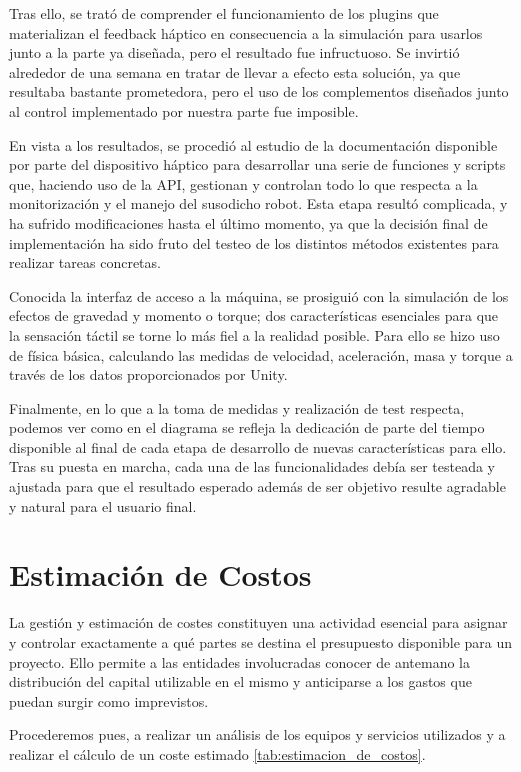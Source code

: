 Tras ello, se trató de comprender el funcionamiento de los plugins que materializan el feedback háptico en consecuencia a la simulación para usarlos junto a la parte ya diseñada, pero el resultado fue infructuoso. Se invirtió alrededor de una semana en tratar de llevar a efecto esta solución, ya que resultaba bastante prometedora, pero el uso de los complementos diseñados junto al control implementado por nuestra parte fue imposible. 

En vista a los resultados, se procedió al estudio de la documentación disponible por parte del dispositivo háptico para desarrollar una serie de funciones y scripts que, haciendo uso de la API, gestionan y controlan todo lo que respecta a la monitorización y el manejo del susodicho robot. Esta etapa resultó complicada, y ha sufrido modificaciones hasta el último momento, ya que la decisión final de implementación ha sido fruto del testeo de los distintos métodos existentes para realizar tareas concretas.

Conocida la interfaz de acceso a la máquina, se prosiguió con la simulación de los efectos de gravedad y momento o torque; dos características esenciales para que la sensación táctil se torne lo más fiel a la realidad posible. Para ello se hizo uso de física básica, calculando las medidas de velocidad, aceleración, masa y torque a través de los datos proporcionados por Unity.

Finalmente, en lo que a la toma de medidas y realización de test respecta, podemos ver como en el diagrama se refleja la dedicación de parte del tiempo disponible al final de cada etapa de desarrollo de nuevas características para ello. Tras su puesta en marcha, cada una de las funcionalidades debía ser testeada y ajustada para que el resultado esperado además de ser objetivo resulte agradable y natural para el usuario final.

\section{Estimación de Costos}

La gestión y estimación de costes constituyen una actividad esencial para asignar y controlar exactamente a qué partes se destina el presupuesto disponible para un proyecto. Ello permite a las entidades involucradas conocer de antemano 	la distribución del capital utilizable en el mismo y anticiparse a los gastos que puedan surgir como imprevistos.

Procederemos pues, a realizar un análisis de los equipos y servicios utilizados y a realizar el cálculo de un coste estimado \ref{tab:estimacion_de_costos}.

